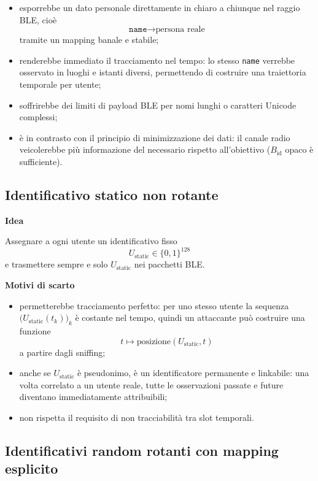\documentclass[a4paper,11pt]{article}
\begin{document}
\begin{itemize}[nosep]
  \item esporrebbe un dato personale direttamente in chiaro a chiunque nel raggio BLE, cioè
        \[
          \texttt{name} \longrightarrow \text{persona reale}
        \]
        tramite un mapping banale e stabile;
  \item renderebbe immediato il tracciamento nel tempo: lo stesso \texttt{name} verrebbe osservato
        in luoghi e istanti diversi, permettendo di costruire una traiettoria temporale per utente;
  \item soffrirebbe dei limiti di payload BLE per nomi lunghi o caratteri Unicode complessi;
  \item è in contrasto con il principio di minimizzazione dei dati: il canale radio veicolerebbe
        più informazione del necessario rispetto all’obiettivo (\(B_{\text{id}}\) opaco è sufficiente).
\end{itemize}

\subsection{Identificativo statico non rotante}

\textbf{Idea}

Assegnare a ogni utente un identificativo fisso
\[
  U_{\text{static}} \in \{0,1\}^{128}
\]
e trasmettere sempre e solo \(U_{\text{static}}\) nei pacchetti BLE.

\textbf{Motivi di scarto}

\begin{itemize}[nosep]
  \item permetterebbe tracciamento perfetto: per uno stesso utente la sequenza
        \(\bigl(U_{\text{static}}(t_k)\bigr)_k\) è costante nel tempo, quindi un attaccante può
        costruire una funzione
        \[
          t \longmapsto \text{posizione}(U_{\text{static}}, t)
        \]
        a partire dagli sniffing;
  \item anche se \(U_{\text{static}}\) è pseudonimo, è un identificatore permanente e linkabile:
        una volta correlato a un utente reale, tutte le osservazioni passate e future diventano
        immediatamente attribuibili;
  \item non rispetta il requisito di non tracciabilità tra slot temporali.
\end{itemize}

\subsection{Identificativi random rotanti con mapping esplicito}
\end{document}
